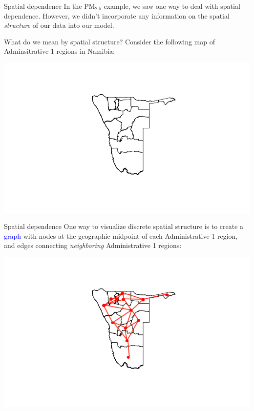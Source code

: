 \documentclass[10pt,t]{beamer}
\begin{document}
\begin{frame}{Spatial dependence}
In the $\text{PM}_{2.5}$ example, we saw one way to deal with spatial dependence. However, we didn't incorporate any information on the spatial \textit{structure} of our data into our model. 

\vspace{0.3cm}

What do we mean by spatial structure? Consider the following map of Adminsitrative 1
regions in Namibia:

\centering \includegraphics[scale=0.4]{namibia_admin1.png}

\end{frame}

\begin{frame}{Spatial dependence}
One way to visualize discrete spatial structure is to create a \textcolor{blue}{graph} with nodes at the geographic midpoint of each Administrative 1 region, and edges connecting \textit{neighboring} Administrative 1 regions:

\vspace{0.3cm}

\centering \includegraphics[scale=0.4]{namibia_admin1_2.png}

\end{frame}
\end{document}
